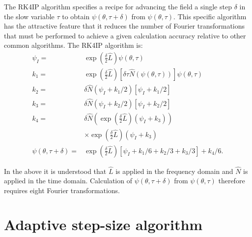 The RK4IP algorithm specifies a recipe for advancing the field a single step $\delta$ in the slow variable $\tau$ to obtain $\psi(\theta,\tau+\delta)$ from $\psi(\theta,\tau)$. This specific algorithm has the attractive feature that it reduces the number of Fourier transformations that must be performed to achieve a given calculation accuracy relative to other common algorithms. The RK4IP algorithm is\cite{Hult2007}:
\begin{align}
\psi_I=&\exp\left(\frac{\delta}{2}\hat{L}\right)\psi(\theta,\tau) \\
k_1=&\exp\left(\frac{\delta}{2}\hat{L}\right)\left[\delta\tau\hat{N}(\psi(\theta,\tau))\right]\psi(\theta,\tau) \\
k_2=&\delta\hat{N}(\psi_I+k_1/2)\left[\psi_I+k_1/2\right] \\
k_3=&\delta\hat{N}(\psi_I+k_2/2)\left[\psi_I+k_2/2\right] \\
k_4=&\delta\hat{N}\left(\exp\left(\frac{\delta}{2}\hat{L}\right)(\psi_I+k_3)\right) \\
&\times\exp\left(\frac{\delta}{2}\hat{L}\right)(\psi_I+k_3)\\
\psi(\theta,\tau+\delta)=&\exp\left(\frac{\delta}{2}\hat{L}\right)[\psi_I+k_1/6+k_2/3+k_3/3]+k_4/6.
\end{align}

In the above it is understood that $\hat{L}$ is applied in the frequency domain and $\hat{N}$ is applied in the time domain. Calculation of $\psi(\theta,\tau+\delta)$ from $\psi(\theta,\tau)$ therefore requires eight Fourier transformations.

\section{Adaptive step-size algorithm}


